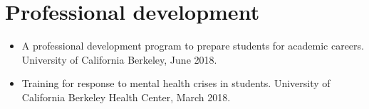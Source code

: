 \documentclass[letterpaper]{deedy-resume} %
\begin{document}




  





  
  



\vspace{0.2cm}
\section{Professional development}
\vspace{0.2cm}

\begin{itemize}

\item {} A professional development program to prepare students for academic careers. University of California Berkeley, June 2018.
  
\item {} Training for response to mental health crises in students. University of California Berkeley Health Center, March 2018.

\end{itemize}
\end{document}
